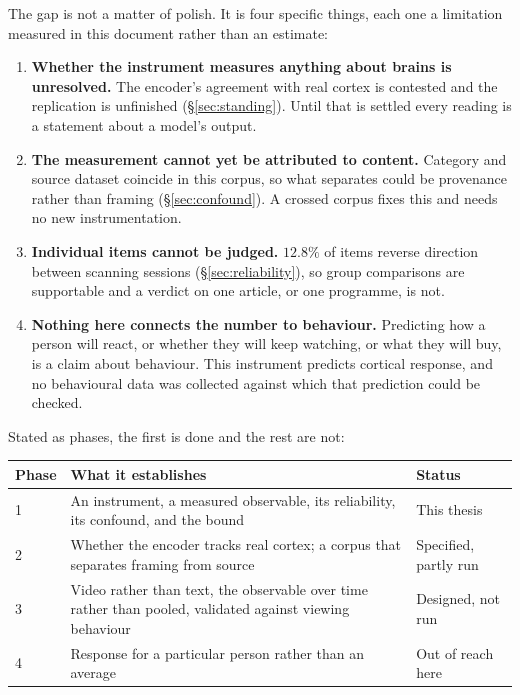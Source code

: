 The gap is not a matter of polish. It is four specific things, each one a limitation measured
in this document rather than an estimate:

\begin{enumerate}
\item \textbf{Whether the instrument measures anything about brains is unresolved.} The
encoder's agreement with real cortex is contested and the replication is unfinished
(\S\ref{sec:standing}). Until that is settled every reading is a statement about a model's
output.
\item \textbf{The measurement cannot yet be attributed to content.} Category and source
dataset coincide in this corpus, so what separates could be provenance rather than framing
(\S\ref{sec:confound}). A crossed corpus fixes this and needs no new instrumentation.
\item \textbf{Individual items cannot be judged.} $12.8\%$ of items reverse direction between
scanning sessions (\S\ref{sec:reliability}), so group comparisons are supportable and a
verdict on one article, or one programme, is not.
\item \textbf{Nothing here connects the number to behaviour.} Predicting how a person will
react, or whether they will keep watching, or what they will buy, is a claim about behaviour.
This instrument predicts cortical response, and no behavioural data was collected against
which that prediction could be checked.
\end{enumerate}

Stated as phases, the first is done and the rest are not:

\begin{center}
\begin{tabular}{@{}p{}p{}p{}@{}}
\toprule
\textbf{Phase} & \textbf{What it establishes} & \textbf{Status} \\
\midrule
1 & An instrument, a measured observable, its reliability, its confound, and the bound &
This thesis \\
2 & Whether the encoder tracks real cortex; a corpus that separates framing from source &
Specified, partly run \\
3 & Video rather than text, the observable over time rather than pooled, validated against
viewing behaviour & Designed, not run \\
4 & Response for a particular person rather than an average & Out of reach here \\
\bottomrule
\end{tabular}
\end{center}

